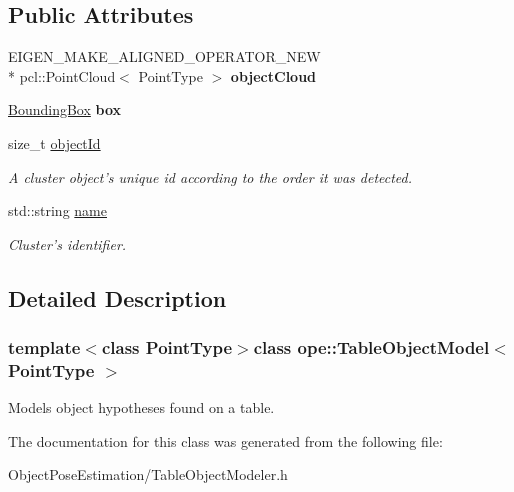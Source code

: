 \subsection*{Public Attributes}
\begin{DoxyCompactItemize}
\item 
\hypertarget{classope_1_1_table_object_model_ab39ed765e08e6afe5ee31aad5e715c97}{E\-I\-G\-E\-N\-\_\-\-M\-A\-K\-E\-\_\-\-A\-L\-I\-G\-N\-E\-D\-\_\-\-O\-P\-E\-R\-A\-T\-O\-R\-\_\-\-N\-E\-W \\*
pcl\-::\-Point\-Cloud$<$ Point\-Type $>$ {\bfseries object\-Cloud}}\label{classope_1_1_table_object_model_ab39ed765e08e6afe5ee31aad5e715c97}

\item 
\hypertarget{classope_1_1_table_object_model_a88b5153024c7f989ff525d355b5ccc4d}{\hyperlink{classope_1_1_bounding_box}{Bounding\-Box} {\bfseries box}}\label{classope_1_1_table_object_model_a88b5153024c7f989ff525d355b5ccc4d}

\item 
\hypertarget{classope_1_1_table_object_model_add06dab2f7775e8152438d620c10bf1c}{size\-\_\-t \hyperlink{classope_1_1_table_object_model_add06dab2f7775e8152438d620c10bf1c}{object\-Id}}\label{classope_1_1_table_object_model_add06dab2f7775e8152438d620c10bf1c}

\begin{DoxyCompactList}\small\item\em A cluster object's unique id according to the order it was detected. \end{DoxyCompactList}\item 
\hypertarget{classope_1_1_table_object_model_a7fb312fa746d81644f1381d618714144}{std\-::string \hyperlink{classope_1_1_table_object_model_a7fb312fa746d81644f1381d618714144}{name}}\label{classope_1_1_table_object_model_a7fb312fa746d81644f1381d618714144}

\begin{DoxyCompactList}\small\item\em Cluster's identifier. \end{DoxyCompactList}\end{DoxyCompactItemize}


\subsection{Detailed Description}
\subsubsection*{template$<$class Point\-Type$>$class ope\-::\-Table\-Object\-Model$<$ Point\-Type $>$}

Models object hypotheses found on a table. 

The documentation for this class was generated from the following file\-:\begin{DoxyCompactItemize}
\item 
Object\-Pose\-Estimation/Table\-Object\-Modeler.\-h\end{DoxyCompactItemize}
